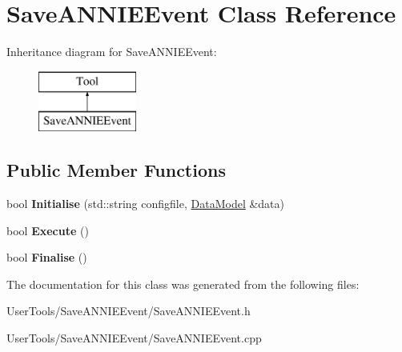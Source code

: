 \hypertarget{classSaveANNIEEvent}{\section{Save\-A\-N\-N\-I\-E\-Event Class Reference}
\label{classSaveANNIEEvent}
}
Inheritance diagram for Save\-A\-N\-N\-I\-E\-Event\-:\begin{figure}[H]
\begin{center}
\leavevmode
\includegraphics[height=2.000000cm]{classSaveANNIEEvent}
\end{center}
\end{figure}
\subsection*{Public Member Functions}
\begin{DoxyCompactItemize}
\item 
\hypertarget{classSaveANNIEEvent_a7b9e87736d43d8445461f4e50d36e759}{bool {\bfseries Initialise} (std\-::string configfile, \hyperlink{classDataModel}{Data\-Model} \&data)}\label{classSaveANNIEEvent_a7b9e87736d43d8445461f4e50d36e759}

\item 
\hypertarget{classSaveANNIEEvent_a54da8199880cd8655b9b177c96df2b04}{bool {\bfseries Execute} ()}\label{classSaveANNIEEvent_a54da8199880cd8655b9b177c96df2b04}

\item 
\hypertarget{classSaveANNIEEvent_a258f70640d20f542fd51805c6f564b45}{bool {\bfseries Finalise} ()}\label{classSaveANNIEEvent_a258f70640d20f542fd51805c6f564b45}

\end{DoxyCompactItemize}


The documentation for this class was generated from the following files\-:\begin{DoxyCompactItemize}
\item 
User\-Tools/\-Save\-A\-N\-N\-I\-E\-Event/Save\-A\-N\-N\-I\-E\-Event.\-h\item 
User\-Tools/\-Save\-A\-N\-N\-I\-E\-Event/Save\-A\-N\-N\-I\-E\-Event.\-cpp\end{DoxyCompactItemize}
